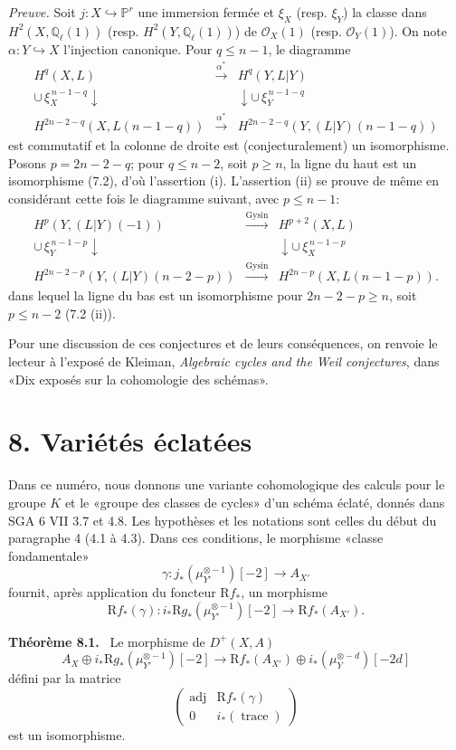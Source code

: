 \documentclass[11pt]{article}
\newenvironment{statement}[1]{\par\medskip\noindent\textbf{#1.}\ }{\par\medskip}
\newcommand{\R}{\mathrm{R}}\newcommand{\RHomCore}{\mathrm{RHom}}
\providecommand{\R}{\mathrm R}
\begin{document}
\emph{Preuve.} Soit $j:X\hookrightarrow\mathbb P^r$ une immersion fermée et $\xi_X$ (resp. $\xi_Y$) la classe dans $H^2(X,\mathbb Q_\ell(1))$ (resp. $H^2(Y,\mathbb Q_\ell(1))$) de $\mathcal O_X(1)$ (resp. $\mathcal O_Y(1)$). On note $\alpha:Y\hookrightarrow X$ l'injection canonique. Pour $q\le n-1$, le diagramme
\[
\begin{array}{ccc}
H^q(X,L)&\xrightarrow{\alpha^*}&H^q(Y,L|Y)\\
\cup\,\xi_X^{\,n-1-q}\downarrow&&\downarrow\cup\,\xi_Y^{\,n-1-q}\\
H^{2n-2-q}(X,L(n-1-q))&\xrightarrow{\alpha^*}&
H^{2n-2-q}(Y,(L|Y)(n-1-q))
\end{array}
\]
est commutatif et la colonne de droite est (conjecturalement) un isomorphisme. Posons $p=2n-2-q$; pour $q\le n-2$, soit $p\ge n$, la ligne du haut est un isomorphisme (7.2), d'où l'assertion (i). L'assertion (ii) se prouve de même en considérant cette fois le diagramme suivant, avec $p\le n-1$:
\[
\begin{array}{ccc}
H^p(Y,(L|Y)(-1))&\xrightarrow{\mathrm{Gysin}}&H^{p+2}(X,L)\\
\cup\,\xi_Y^{\,n-1-p}\downarrow&&\downarrow\cup\,\xi_X^{\,n-1-p}\\
H^{2n-2-p}(Y,(L|Y)(n-2-p))&\xrightarrow{\mathrm{Gysin}}&
H^{2n-p}(X,L(n-1-p)).
\end{array}
\]
dans lequel la ligne du bas est un isomorphisme pour $2n-2-p\ge n$, soit $p\le n-2$ (7.2 (ii)).

Pour une discussion de ces conjectures et de leurs conséquences, on renvoie le lecteur à l'exposé de Kleiman, \emph{Algebraic cycles and the Weil conjectures}, dans «Dix exposés sur la cohomologie des schémas».

\section*{8. Variétés éclatées}

Dans ce numéro, nous donnons une variante cohomologique des calculs pour le groupe $K$ et le «groupe des classes de cycles» d'un schéma éclaté, donnés dans SGA 6 VII 3.7 et 4.8. Les hypothèses et les notations sont celles du début du paragraphe 4 (4.1 à 4.3). Dans ces conditions, le morphisme «classe fondamentale»
\[
\gamma:j_*(\mu_{Y'}^{\otimes -1})[-2]\to A_{X'}
\]
fournit, après application du foncteur $\R f_*$, un morphisme
\[
\R f_*(\gamma):i_*\R g_*(\mu_{Y'}^{\otimes -1})[-2]\to \R f_*(A_{X'}).
\]

\begin{statement}{Théorème 8.1}
Le morphisme de $D^+(X,A)$
\[
A_X\oplus i_*\R g_*(\mu_{Y'}^{\otimes -1})[-2]\to
\R f_*(A_{X'})\oplus i_*(\mu_Y^{\otimes -d})[-2d]
\tag{8.1.1}
\]
défini par la matrice
\[
\begin{pmatrix}
\operatorname{adj}&\R f_*(\gamma)\\
0&i_*(\operatorname{trace})
\end{pmatrix}
\]
est un isomorphisme.
\end{statement}
\end{document}
